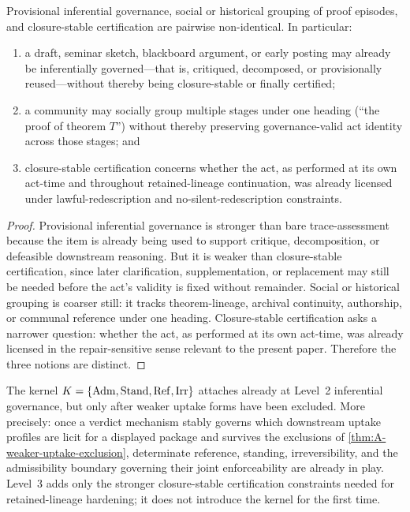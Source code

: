 \begin{theorem}
\label{thm:A-provisional-social-governance}
Provisional inferential governance, social or historical grouping of proof episodes, and closure-stable certification are pairwise non-identical. In particular:
\begin{enumerate}[label=(\roman*), leftmargin=2.5em]
    \item a draft, seminar sketch, blackboard argument, or early posting may already be inferentially governed---that is, critiqued, decomposed, or provisionally reused---without thereby being closure-stable or finally certified;
    \item a community may socially group multiple stages under one heading (``the proof of theorem $T$'') without thereby preserving governance-valid act identity across those stages; and
    \item closure-stable certification concerns whether the act, as performed at its own act-time and throughout retained-lineage continuation, was already licensed under lawful-redescription and no-silent-redescription constraints.
\end{enumerate}
\end{theorem}

\begin{proof}
Provisional inferential governance is stronger than bare trace-assessment because the item is already being used to support critique, decomposition, or defeasible downstream reasoning. But it is weaker than closure-stable certification, since later clarification, supplementation, or replacement may still be needed before the act's validity is fixed without remainder. Social or historical grouping is coarser still: it tracks theorem-lineage, archival continuity, authorship, or communal reference under one heading. Closure-stable certification asks a narrower question: whether the act, as performed at its own act-time, was already licensed in the repair-sensitive sense relevant to the present paper. Therefore the three notions are distinct.
\end{proof}

\begin{theorem}
\label{thm:A-kernel-attachment}
The kernel $K=\{\mathrm{Adm},\mathrm{Stand},\mathrm{Ref},\mathrm{Irr}\}$ attaches already at Level~2 inferential governance, but only after weaker uptake forms have been excluded. More precisely: once a verdict mechanism stably governs which downstream uptake profiles are licit for a displayed package and survives the exclusions of \cref{thm:A-weaker-uptake-exclusion}, determinate reference, standing, irreversibility, and the admissibility boundary governing their joint enforceability are already in play. Level~3 adds only the stronger closure-stable certification constraints needed for retained-lineage hardening; it does not introduce the kernel for the first time.
\end{theorem}

